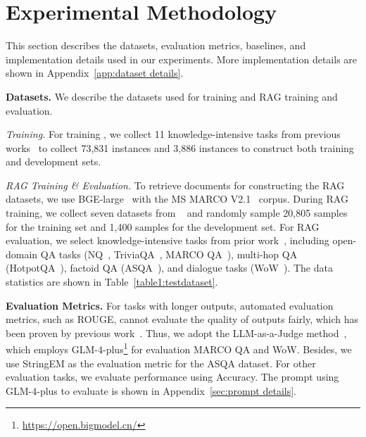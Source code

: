 
\section{Experimental Methodology}
This section describes the datasets, evaluation metrics, baselines, and implementation details used in our experiments. More implementation details are shown in Appendix~\ref{app:dataset details}.



\textbf{Datasets.} We describe the datasets used for training \method{} and RAG training and evaluation.


\textit{\method{} Training.} For training \method{}, we collect 11 knowledge-intensive tasks from previous works~\cite{Chung2022flan_t5,izacard2022few} to collect 73,831 instances and 3,886 instances to construct both training and development sets.


\textit{RAG Training \& Evaluation.} To retrieve documents for constructing the RAG datasets, we use BGE-large~\citep{bge_embedding} with the MS MARCO V2.1~\citep{bajaj2016ms} corpus. During RAG training, we collect seven datasets from ~\citet{rag-ddr2024Li} and randomly sample 20,805 samples for the training set and 1,400 samples for the development set. For RAG evaluation, we select knowledge-intensive tasks from prior work~\citep{rag-ddr2024Li, xu2024unsupervised}, including open-domain QA tasks (NQ~\citep{nq2019Kwiatkowski}, TriviaQA~\citep{triviaqa2017Joshi}, MARCO QA~\citep{bajaj2016ms}), multi-hop QA (HotpotQA~\cite{hotpotqa2018Yang}), factoid QA (ASQA~\cite{ASQA2022Stelmakh}), and dialogue tasks (WoW~\cite{wow2019Dinan}). The data statistics are shown in Table~\ref{table1:testdataset}.


\textbf{Evaluation Metrics.} 
For tasks with longer outputs, automated evaluation metrics, such as ROUGE, cannot evaluate the quality of outputs fairly, which has been proven by previous work~\cite{EnablingLargeLanguageModelstoGenerateTextwithCitations2023GaoTianyu,llmeval2024zhang}. Thus, we adopt the LLM-as-a-Judge method~\citep{llmeval2024zhang}, which employs GLM-4-plus\footnote{\url{https://open.bigmodel.cn/}} for evaluation MARCO QA and WoW. Besides, we use StringEM as the evaluation metric for the ASQA dataset. For other evaluation tasks, we evaluate performance using Accuracy. The prompt using GLM-4-plus to evaluate is shown in Appendix~\ref{sec:prompt details}.


